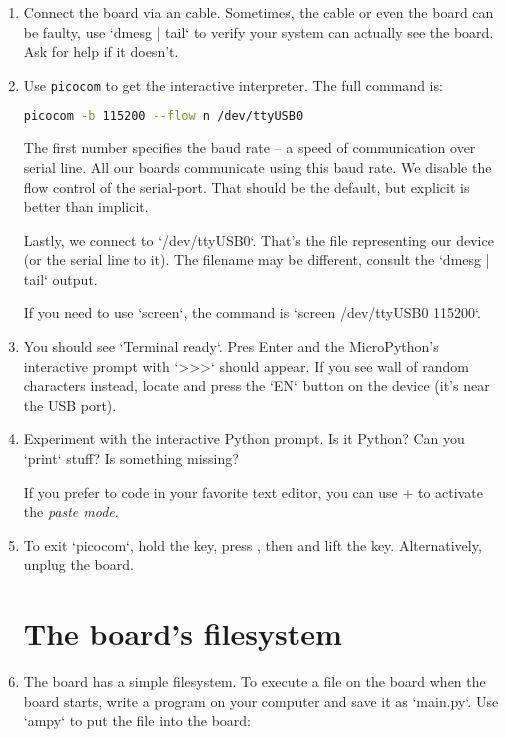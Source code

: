 \documentclass{../tutorial}
\begin{document}
\begin{enumerate}
\item
    Connect the  board via an  cable.
    Sometimes, the cable or even the board can be faulty,
    use `dmesg | tail` to verify your system can actually see the board.
    Ask for help if it doesn't.

\item
    Use \texttt{picocom} to get the interactive interpreter.
    The full command is:

    \begin{lstlisting}[language=bash]
    picocom -b 115200 --flow n /dev/ttyUSB0
    \end{lstlisting}

    The first number specifies the baud rate -- a speed of communication over serial line.
    All our  boards communicate using this baud rate.
    We disable the flow control of the serial-port.
    That should be the default,
    but explicit is better than implicit.

    Lastly, we connect to `/dev/ttyUSB0`.
    That's the file representing our device (or the serial line to it).
    The filename may be different, consult the `dmesg | tail` output.

    If you need to use `screen`,
    the command is `screen /dev/ttyUSB0 115200`.

\item
    You should see `Terminal ready`.
    Pres Enter and the MicroPython's interactive prompt with `>>>` should appear.
    If you see wall of random characters instead,
    locate and press the `EN` button on the device
    (it's near the USB port).

\item
    Experiment with the interactive Python prompt. Is it Python?
    Can you `print` stuff? Is something missing?

    If you prefer to code in your favorite text editor,
    you can use + to activate the \emph{paste mode}.

\item
    To exit `picocom`, hold the  key, press ,
    then  and lift the  key.
    Alternatively, unplug the board.

\section{The board's filesystem}

\item
    The board has a simple filesystem.
    To execute a file on the board when the board starts,
    write a program on your computer and save it as `main.py`.
    Use `ampy` to put the file into the board:


\end{enumerate}
\end{document}
